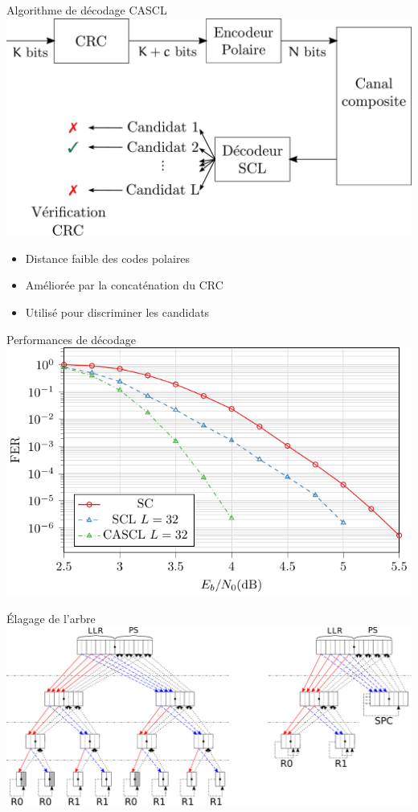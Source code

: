 \documentclass[t,compress,mathserif,12pt,xcolor=dvipsnames]{beamer}
\begin{document}
\begin{frame}[c]{Algorithme de décodage CASCL}
			\includegraphics[width=\textwidth]{./fig/cascl}
			\begin{itemize}
				\item Distance faible des codes polaires
				\item Améliorée par la concaténation du CRC
				\item Utilisé pour discriminer les candidats
			\end{itemize}
\end{frame}

\begin{frame}[c]{Performances de décodage}
			\includegraphics[width=\textwidth]{./fig/scl_L/tikz/source}
\end{frame}

\begin{frame}[c]{\'Elagage de l'arbre}
			\includegraphics[width=\textwidth]{./fig/pruning}
\end{frame}
\end{document}
